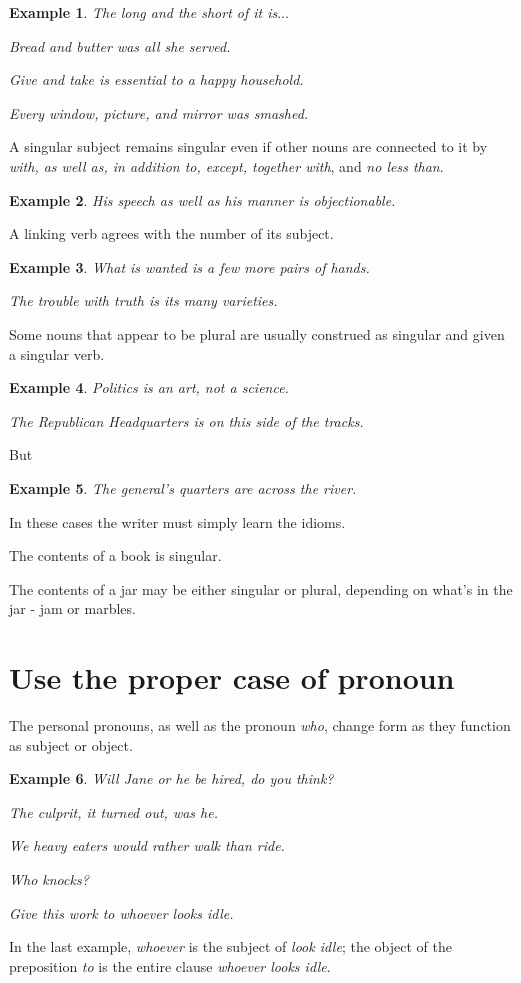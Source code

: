 \documentclass{book}
\numberwithin{equation}{section}
\newtheorem{example}{Example}[chapter]
\begin{document}
\begin{example}
    The long and the short of it is$\ldots$
    
    Bread and butter was all she served.
    
    Give and take is essential to a happy household.
    
    Every window, picture, and mirror was smashed.
\end{example}
A singular subject remains singular even if other nouns are connected to it by \textit{with, as well as, in addition to, except, together with}, and \textit{no less than}.
\begin{example}
    His speech as well as his manner is objectionable.
\end{example}
A linking verb agrees with the number of its subject.
\begin{example}
    What is wanted is a few more pairs of hands.
    
    The trouble with truth is its many varieties.
\end{example}
Some nouns that appear to be plural are usually construed as singular and given a singular verb.
\begin{example}
    Politics is an art, not a science.
    
    The Republican Headquarters is on this side of the tracks.
\end{example}
But
\begin{example}
    The general's quarters are across the river.
\end{example}
In these cases the writer must simply learn the idioms.

The contents of a book is singular.

The contents of a jar may be either singular or plural, depending on what's in the jar - jam or marbles.

\section{Use the proper case of pronoun}
The personal pronouns, as well as the pronoun \textit{who}, change form as they function as subject or object.
\begin{example}
    Will Jane or he be hired, do you think?
    
    The culprit, it turned out, was he.
    
    We heavy eaters would rather walk than ride.
    
    Who knocks?
    
    Give this work to whoever looks idle.
\end{example}
In the last example, \textit{whoever} is the subject of \textit{look idle}; the object of the preposition \textit{to} is the entire clause \textit{whoever looks idle}.
\end{document}
